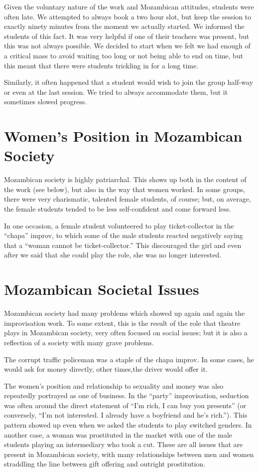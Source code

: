 \documentclass[article,twoside]{memoir}
\begin{document}
Given the voluntary nature of the work and Mozambican attitudes, students were
often late. We attempted to always book a two hour slot, but keep the session
to exactly ninety minutes from the moment we actually started. We informed the
students of this fact. It was very helpful if one of their teachers was
present, but this was not always possible. We decided to start when we felt we
had enough of a critical mass to avoid waiting too long or not being able to
end on time, but this meant that there were students trickling in for a long
time.

Similarly, it often happened that a student would wish to join the group
half-way or even at the last session. We tried to always accommodate them, but
it sometimes slowed progress.

\section{Women's Position in Mozambican Society}

Mozambican society is highly patriarchal. This shows up both in the content
of the work (see below), but also in the way that women worked. In some groups,
there were very charismatic, talented female students, of course; but, on
average, the female students tended to be less self-confident and come forward
less.

In one occasion, a female student volunteered to play ticket-collector in the
``chapa'' improv, to which some of the male students reacted negatively saying
that a ``woman cannot be ticket-collector.'' This discouraged the girl and even
after we said that she could play the role, she was no longer interested.

\section{Mozambican Societal Issues}

Mozambican society had many problems which showed up again and again the
improvisation work. To some extent, this is the result of the role that theatre
plays in Mozambican society, very often focused on social issues; but it is
also a reflection of a society with many grave problems.

The corrupt traffic policeman was a staple of the chapa improv. In some cases,
he would ask for money directly, other times,the driver would offer it.

The women's position and relationship to sexuality and money was also
repeatedly portrayed as one of business. In the ``party'' improvisation,
seduction was often around the direct statement of ``I'm rich, I can buy you
presents'' (or conversely, ``I'm not interested. I already have a boyfriend and
he's rich.''). This pattern showed up even when we asked the students to play
switched genders. In another case, a woman was prostituted in the market with
one of the male students playing an intermediary who took a cut. These are all
issues that are present in Mozambican society, with many relationships between
men and women straddling the line between gift offering and outright
prostitution.
\end{document}
